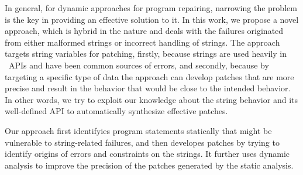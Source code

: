 In general, for dynamic approaches for program repairing, narrowing the problem
is the key in providing an effective solution to it. In this work, we propose a novel
approach, which is hybrid in the nature and
deals with the failures originated from either malformed strings or incorrect
handling of strings. The approach targets string variables for patching, firstly, because
strings are used heavily in \java\ APIs and have been common sources
of errors, and secondly, because by targeting a specific type of data
the approach can develop patches that are more precise and result in the
behavior that would be close to the intended behavior. In other words, we try to exploit our
knowledge about the string behavior and its well-defined API to automatically synthesize 
effective patches.

Our approach first identifyies program statements statically
that might be vulnerable to string-related failures, and then developes patches
by trying to identify origins of errors and constraints on the strings. It further uses dynamic
analysis to improve the precision of the patches generated by the static
analysis. 


